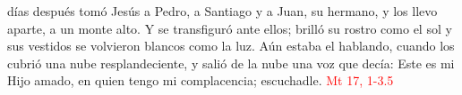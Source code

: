 días después tomó Jesús a Pedro, a Santiago y a Juan, su hermano, y los llevo aparte, a un monte alto. Y se transfiguró ante ellos;
brilló su rostro como el sol y sus vestidos se volvieron blancos como la luz. Aún estaba el hablando, cuando los cubrió una nube resplandeciente,
y salió de la nube una voz que decía: Este es mi Hijo amado, en quien tengo mi complacencia; escuchadle. \textcolor{red}{Mt 17, 1-3.5}